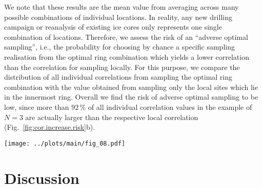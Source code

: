 \documentclass[draft]{agujournal2019}
\begin{document}
We note that these results are the mean value from averaging across many
possible combinations of individual locations. In reality, any new drilling
campaign or reanalysis of existing ice cores only represents one single
combination of locations. Therefore, we assess the risk of an ``adverse optimal
sampling'', i.e., the probability for choosing by chance a specific sampling
realisation from the optimal ring combination which yields a lower correlation
than the correlation for sampling locally. For this purpose, we compare the
distribution of all individual correlations from sampling the optimal ring
combination with the value obtained from sampling only the local sites which lie
in the innermost ring. Overall we find the risk of adverse optimal sampling to
be low, since more than $92\,\%$ of all individual correlation values in the
example of $N=3$ are actually larger than the respective local correlation
(Fig.~\ref{fig:cor.increase.risk}b).

\begin{figure*}[t]%
\centering
\texttt{[image: ../plots/main/fig\_08.pdf]}
\caption{%
  Gain in correlation and risk of adverse sampling. (\textbf{a}) The average
  correlation with the target temperature at the EDML (red) and Vostok (blue)
  sites depending on the number of locations, $N$, used for averaging the
  $\delta^{18}\mathrm{O}^{\mathrm{(pw)}}$ time series. Sampling is performed
  either locally from the innermost ring only (dashed lines), or from all
  possible individual combinations of locations for the respective optimal ring
  combination determined for each $N$ (solid lines). Compared to the local
  samples which show virtually no increase with the number of sampled locations,
  the correlation increases markedly with $N$ when sampling from the optimal
  rings, as highlighted by the shaded area. (\textbf{b}) Histogram of all
  possible individual correlations for sampling from the optimal ring
  combination when averaging $N=3$ locations compared to the correlation
  (vertical lines) for sampling from the innermost ring only, displayed for the
  EDML (red) and Vostok (blue) target sites. For more than $90\,\%$ of the
  optimal ring combination samples, the correlation is higher than the local
  value.}
\label{fig:cor.increase.risk}%
\end{figure*}%

\section{Discussion}\label{discussion}
\end{document}
